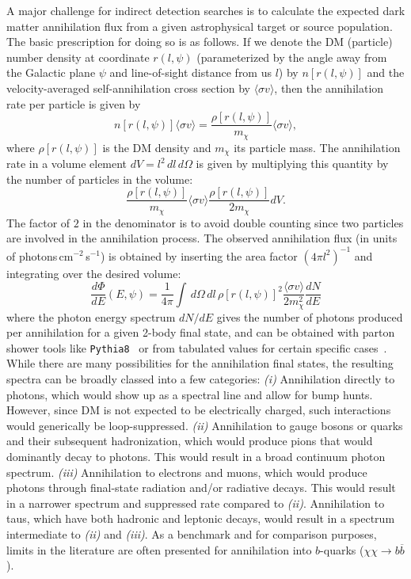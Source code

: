 A major challenge for indirect detection searches is to calculate the expected dark matter annihilation flux from a given astrophysical target or source population. The basic prescription for doing so is as follows. If we denote the DM (particle) number density at coordinate $r(l,\psi)$ (parameterized by the angle away from the Galactic plane $\psi$ and line-of-sight distance from us $l$) by $n[r(l,\psi)]$ and the velocity-averaged self-annihilation cross section by $\langle\sigma v\rangle$, then the annihilation rate per particle is given by
\begin{equation}
n[r(l,\psi)]\langle\sigma v\rangle = \frac{\rho[r(l,\psi)]}{m_\chi}\langle\sigma v\rangle,
\end{equation}
where $\rho[r(l,\psi)]$ is the DM density and $m_\chi$ its particle mass. The annihilation rate in a volume element $dV = l^2\,dl\,d\Omega$ is given by multiplying this quantity by the number of particles in the volume:
\begin{equation}
\frac{\rho[r(l,\psi)]}{m_\chi}\langle\sigma v\rangle \frac{\rho[r(l,\psi)]}{2m_\chi}dV.
\end{equation}
The factor of $2$ in the denominator is to avoid double counting since two particles are involved in the annihilation process. The observed annihilation flux (in units of photons\,cm$^{-2}$\,s$^{-1}$) is obtained by inserting the area factor $(4\pi l^2)^{-1}$ and integrating over the desired volume:
\begin{equation}
\frac{d\Phi}{dE}(E,\psi) = \frac{1}{4\pi}\int\,d\Omega\,dl\,\rho[r(l,\psi)]^2\frac{\langle\sigma v\rangle}{2m_\chi^2}\frac{dN}{dE}
\end{equation}
where the photon energy spectrum $dN/dE$ gives the number of photons produced per annihilation for a given 2-body final state, and can be obtained with parton shower tools like \texttt{Pythia8}~\cite{Sjostrand:2007gs} or from tabulated values for certain specific cases~\cite{Cirelli:2010xx}. While there are many possibilities for the annihilation final states, the resulting spectra can be broadly classed into a few categories: \emph{(i)} Annihilation directly to photons, which would show up as a spectral line and allow for bump hunts. However, since DM is not expected to be electrically charged, such interactions would generically be loop-suppressed. \emph{(ii)} Annihilation to gauge bosons or quarks and their subsequent hadronization, which would produce pions that would dominantly decay to photons. This would result in a broad continuum photon spectrum. \emph{(iii)} Annihilation to electrons and muons, which would produce photons through final-state radiation and/or radiative decays. This would result in a narrower spectrum and suppressed rate compared to \emph{(ii)}. Annihilation to taus, which have both hadronic and leptonic decays, would result in a spectrum intermediate to \emph{(ii)} and \emph{(iii)}. As a benchmark and for comparison purposes, limits in the literature are often presented for annihilation into $b$-quarks ($\chi\chi\rightarrow b \overline b$). %

